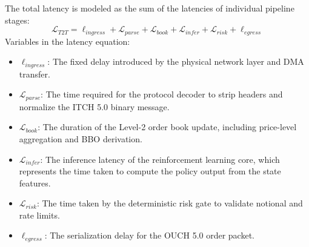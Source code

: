 The total latency is modeled as the sum of the latencies of individual pipeline stages:
\begin{equation}
    \mathcal{L}_{T2T} = \ell_{ingress} + \mathcal{L}_{parse} + \mathcal{L}_{book} + \mathcal{L}_{infer} + \mathcal{L}_{risk} + \ell_{egress}
\end{equation}
Variables in the latency equation:
\begin{itemize}
    \item $\ell_{ingress}$: The fixed delay introduced by the physical network layer and DMA transfer.
    \item $\mathcal{L}_{parse}$: The time required for the protocol decoder to strip headers and normalize the ITCH 5.0 binary message.
    \item $\mathcal{L}_{book}$: The duration of the Level-2 order book update, including price-level aggregation and BBO derivation.
    \item $\mathcal{L}_{infer}$: The inference latency of the reinforcement learning core, which represents the time taken to compute the policy output from the state features.
    \item $\mathcal{L}_{risk}$: The time taken by the deterministic risk gate to validate notional and rate limits.
    \item $\ell_{egress}$: The serialization delay for the OUCH 5.0 order packet.
\end{itemize}

\begin{table}[h!]
    \centering
    \caption{Detailed Breakdown of Tick-to-Trade Latency within the Software Pipeline under Hawkes Load.}
    \label{tab:latency_breakdown}
\end{table}

